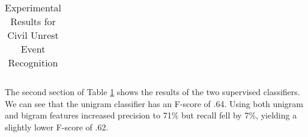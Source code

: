 \begin{table}[ht]
\begin{tabular}[center]{|lccc|}

\end{tabular}
\caption{Experimental Results for Civil Unrest Event Recognition}
\label{facet-results-table}
\end{table}

The second section of Table \ref{facet-results-table} shows the 
results of the two supervised classifiers.
We can see that the unigram
classifier has an F-score of .64. Using both unigram and bigram features increased precision to
71\% but recall fell by 7\%, yielding a slightly lower F-score of .62.


